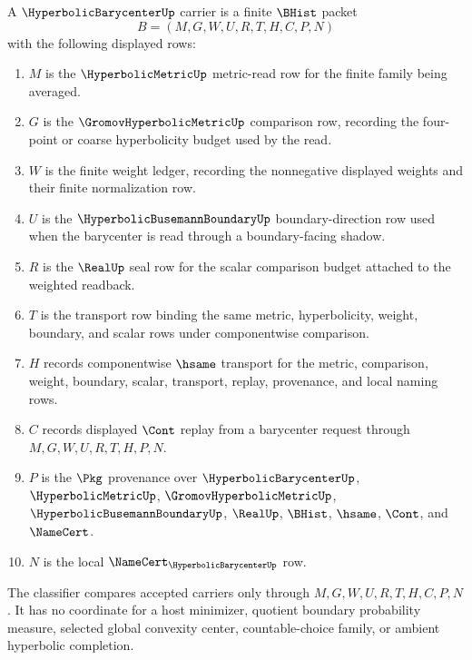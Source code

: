 \begin{definition}
\label{def:hyperbolic-barycenter-carrier}
A $\HyperbolicBarycenterUp$ carrier is a finite $\BHist$ packet
$$
B=(M,G,W,U,R,T,H,C,P,N)
$$
with the following displayed rows:
\begin{enumerate}
\item $M$ is the $\HyperbolicMetricUp$ metric-read row for the finite family being averaged.
\item $G$ is the $\GromovHyperbolicMetricUp$ comparison row, recording the four-point or coarse hyperbolicity budget used by the read.
\item $W$ is the finite weight ledger, recording the nonnegative displayed weights and their finite normalization row.
\item $U$ is the $\HyperbolicBusemannBoundaryUp$ boundary-direction row used when the barycenter is read through a boundary-facing shadow.
\item $R$ is the $\RealUp$ seal row for the scalar comparison budget attached to the weighted readback.
\item $T$ is the transport row binding the same metric, hyperbolicity, weight, boundary, and scalar rows under componentwise comparison.
\item $H$ records componentwise $\hsame$ transport for the metric, comparison, weight, boundary, scalar, transport, replay, provenance, and local naming rows.
\item $C$ records displayed $\Cont$ replay from a barycenter request through $M,G,W,U,R,T,H,P,N$.
\item $P$ is the $\Pkg$ provenance over $\HyperbolicBarycenterUp$, $\HyperbolicMetricUp$, $\GromovHyperbolicMetricUp$, $\HyperbolicBusemannBoundaryUp$, $\RealUp$, $\BHist$, $\hsame$, $\Cont$, and $\NameCert$.
\item $N$ is the local $\NameCert_{\HyperbolicBarycenterUp}$ row.
\end{enumerate}
The classifier compares accepted carriers only through $M,G,W,U,R,T,H,C,P,N$. It has no coordinate for a host minimizer, quotient boundary probability measure, selected global convexity center, countable-choice family, or ambient hyperbolic completion.
\end{definition}

